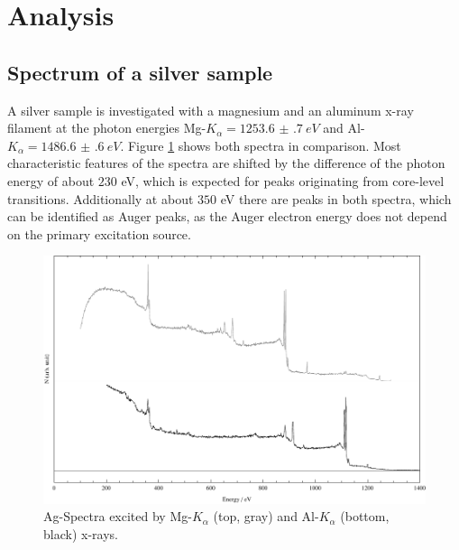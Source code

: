 \documentclass[a4paper]{scrartcl}
\numberwithin{equation}{section}
\numberwithin{figure}{section}
\numberwithin{table}{section}
\begin{document}
\clearpage
\section{Analysis}
\subsection{Spectrum of a silver sample}
A silver sample is investigated with a magnesium and an aluminum x-ray filament at the photon energies Mg-$K_\alpha=\SI{1253.6(7)}{eV}$ and Al-$K_\alpha=\SI{1486.6(6)}{eV}$. Figure \ref{fig:compare} shows both spectra in comparison. Most characteristic features of the spectra are shifted by the difference of the photon energy of about $230$ eV, which is expected for peaks originating from core-level transitions. Additionally at about $350$ eV there are peaks in both spectra, which can be identified as Auger peaks, as the Auger electron energy does not depend on the primary excitation source.

\begin{figure}
  \centering
   	\includegraphics[width=0.75\linewidth]{img/compare.pdf}
 \caption{\small Ag-Spectra excited by Mg-$K_\alpha$ (top, gray) and Al-$K_\alpha$ (bottom, black) x-rays.  }
        \label{fig:compare}
\end{figure}
\end{document}
